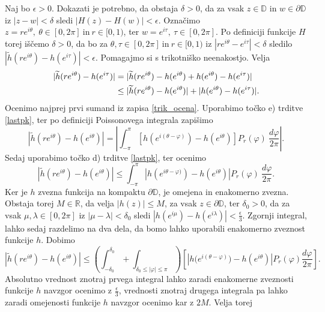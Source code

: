 \documentclass[mat1, tisk]{fmfdelo}
\begin{document}
\begin{dokaz}
        Naj bo $\epsilon >0$. Dokazati je potrebno, da obstaja $\delta >0$, da za vsak $z \in \mathbb{D}$ in $w \in \partial \mathbb{D}$ iz $|z - w| < \delta$ sledi $|H(z) - H(w)| < \epsilon$. 
        Označimo $z = r e^{i \theta},~\theta \in [0,2\pi]~\text{in}~r \in [0,1)$, ter $w = e^{i \tau},~\tau \in [0,2\pi]$.
        Po definiciji funkcije $H$ torej iščemo $\delta >0$, da bo za $\theta, \tau \in [0,2\pi]~\text{in}~r \in [0,1)$ iz $|r e^{i \theta} - e^{i\tau}| < \delta$ sledilo $|\widetilde{h}(r e^{i \theta}) - h(e^{i\tau})| < \epsilon$.
        Pomagajmo si s trikotniško neenakostjo. Velja
        \begin{align}
            \label{trik_ocena}
            |\widetilde{h}(r e^{i \theta}) - h(e^{i\tau})| &= |\widetilde{h}(r e^{i \theta}) - h(e^{i \theta}) + h(e^{i \theta}) - h(e^{i\tau})| \notag \\
            &\leq |\widetilde{h}(r e^{i \theta}) - h(e^{i\theta})| + |h(e^{i\theta}) - h(e^{i\tau})|.
        \end{align}
        Ocenimo najprej prvi sumand iz zapisa \eqref{trik_ocena}. Uporabimo točko e) trditve \ref{lastpk}, ter po definiciji Poissonovega integrala zapišimo
        $$
            \left|\widetilde{h}(r e^{i \theta}) - h(e^{i\theta})\right| = \left|\int_{-\pi}^{\pi}{\left[h\left(e^{i(\theta - \varphi)}\right) - h\left(e^{i\theta}\right)\right]P_r(\varphi)~\frac{d\varphi}{2 \pi}}\right|.
        $$
        Sedaj uporabimo točko d) trditve \ref{lastpk}, ter ocenimo
        $$
        \left|\widetilde{h}(r e^{i \theta}) - h(e^{i\theta})\right| \leq \int_{-\pi}^{\pi}{\left| h\left(e^{i\theta - \varphi)}\right) - h \left(e^{i\theta}\right) \right|P_r(\varphi)~\frac{d\varphi}{2 \pi}}.
        $$ 
        Ker je $h$ zvezna funkcija na kompaktu $\partial \mathbb{D}$, je omejena in enakomerno zvezna.  
        Obstaja torej $M \in \mathbb{R}$, da velja $|h(z)| \leq M$, za vsak $z \in \partial \mathbb{D}$, ter $\delta_0 >0$, da za vsak $\mu, \lambda \in [0,2\pi]$ iz $|\mu - \lambda| < \delta_0$ sledi $|h(e^{i \mu}) - h(e^{i \lambda})| < \frac{\epsilon}{3}$.
        Zgornji integral, lahko sedaj razdelimo na dva dela, da bomo lahko uporabili enakomerno zveznost funkcije $h$. Dobimo
        $$
        \left|\widetilde{h}(re^{i\theta}) - h(e^{i\theta})\right| \leq \left(\int_{-\delta_0}^{\delta_0} + \int_{\delta_0 \leq |\varphi| \le \pi}\right){\left[\left| h\big(e^{i(\theta - \varphi)}\big) - h(e^{i\theta})\right|P_r(\varphi)\frac{d\varphi}{2\pi}\right]}.
        $$
        Absolutno vrednost znotraj prvega integral lahko zaradi enakomerne zveznosti funkcije $h$ navzgor ocenimo z $\frac{\epsilon}{3}$, vrednosti znotraj drugega integrala pa lahko zaradi omejenosti funkcije $h$ navzgor ocenimo kar z $2M$. Velja torej

\end{dokaz}
\end{document}
